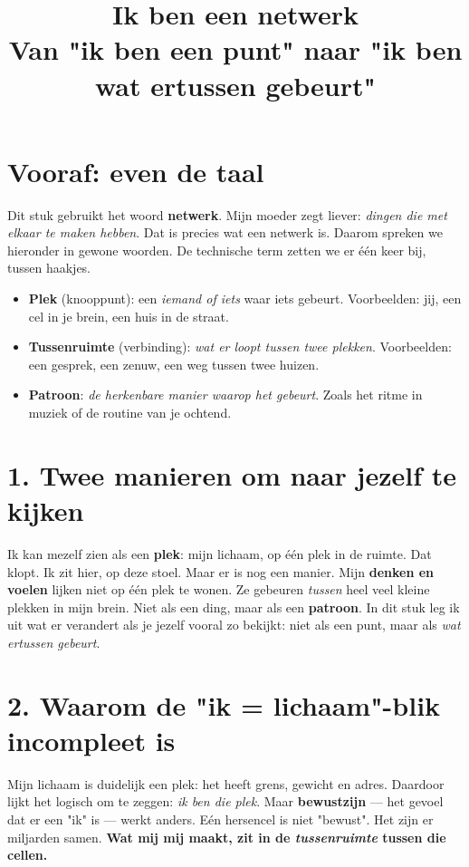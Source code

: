 \documentclass[12pt,a4paper]{article}
\title{\textbf{Ik ben een netwerk}\\Van "ik ben een punt" naar "ik ben wat ertussen gebeurt"}
\author{}
\date{}
\begin{document}
\maketitle

\section*{Vooraf: even de taal}\label{sec:taal}
Dit stuk gebruikt het woord \textbf{netwerk}. Mijn moeder zegt liever: \textit{dingen die met elkaar te maken hebben}. Dat is precies wat een netwerk is. Daarom spreken we hieronder in gewone woorden. De technische term zetten we er één keer bij, tussen haakjes.

\begin{itemize}
\item \textbf{Plek} (knooppunt): een \textit{iemand of iets} waar iets gebeurt. Voorbeelden: jij, een cel in je brein, een huis in de straat.
\item \textbf{Tussenruimte} (verbinding): \textit{wat er loopt tussen twee plekken}. Voorbeelden: een gesprek, een zenuw, een weg tussen twee huizen.
\item \textbf{Patroon}: \textit{de herkenbare manier waarop het gebeurt}. Zoals het ritme in muziek of de routine van je ochtend.
\end{itemize}

\section*{1. Twee manieren om naar jezelf te kijken}
Ik kan mezelf zien als een \textbf{plek}: mijn lichaam, op één plek in de ruimte. Dat klopt. Ik zit hier, op deze stoel. Maar er is nog een manier. Mijn \textbf{denken en voelen} lijken niet op één plek te wonen. Ze gebeuren \textit{tussen} heel veel kleine plekken in mijn brein. Niet als een ding, maar als een \textbf{patroon}. In dit stuk leg ik uit wat er verandert als je jezelf vooral zo bekijkt: niet als een punt, maar als \textit{wat ertussen gebeurt}.

\section*{2. Waarom de "ik = lichaam"-blik incompleet is}
Mijn lichaam is duidelijk een plek: het heeft grens, gewicht en adres. Daardoor lijkt het logisch om te zeggen: \textit{ik ben die plek}. Maar \textbf{bewustzijn} --- het gevoel dat er een "ik" is --- werkt anders. Eén hersencel is niet "bewust". Het zijn er miljarden samen. \textbf{Wat mij mij maakt, zit in de \textit{tussenruimte} tussen die cellen.}
\end{document}
